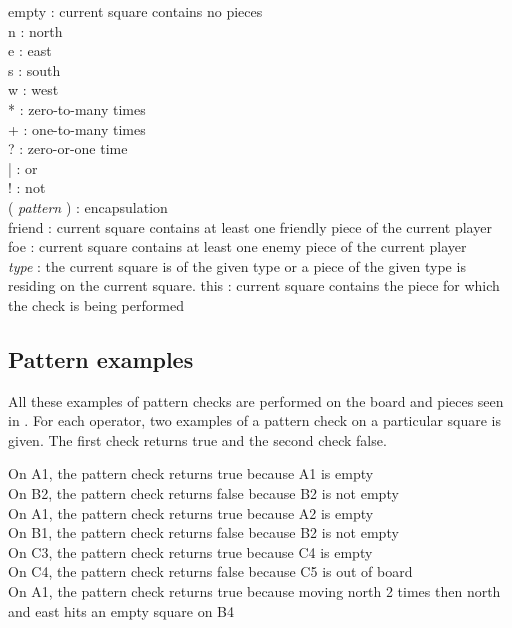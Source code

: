empty : current square contains no pieces\\
n : north \\
e : east \\
s : south \\
w : west \\
* : zero-to-many times\\
+ : one-to-many times\\
? : zero-or-one time\\
| : or\\
! : not\\
( \textit{pattern} ) : encapsulation\\
friend :  current square contains at least one friendly piece of the current player\\
foe : current square contains at least one enemy piece of the current player\\
\textit{type} : the current square is of the given type or a piece of the given type is residing on the current square.
this : current square contains the piece for which the check is being performed\\

\subsection{Pattern examples}
\label{sec:patternexamples}
All these examples of pattern checks are performed on the board and pieces seen in . For each operator, two examples of a pattern check on a particular square is given. The first check returns true and the second check false.

On A1, the pattern check returns true because A1 is empty\\
On B2, the pattern check returns false because B2 is not empty\\
On A1, the pattern check returns true because A2 is empty\\
On B1, the pattern check returns false because B2 is not empty\\
On C3, the pattern check returns true because C4 is empty\\
On C4, the pattern check returns false because C5 is out of board\\
On A1, the pattern check returns true because moving north 2 times then north and east hits an empty square on B4\\

